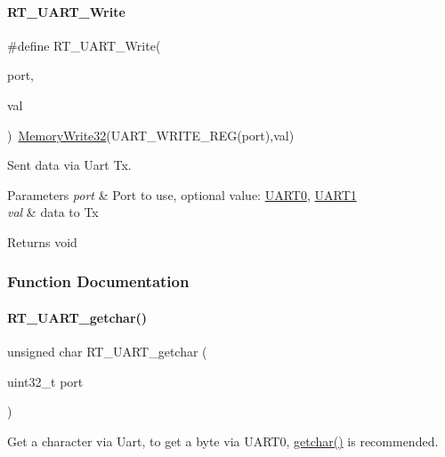 \paragraph{\texorpdfstring{R\+T\+\_\+\+U\+A\+R\+T\+\_\+\+Write}{RT\_UART\_Write}}
{\footnotesize\ttfamily \#define R\+T\+\_\+\+U\+A\+R\+T\+\_\+\+Write(\begin{DoxyParamCaption}\item[{}]{port,  }\item[{}]{val }\end{DoxyParamCaption})~\mbox{\hyperlink{a00020_a6b9732365b12e48ddb89fe1028b975b0}{Memory\+Write32}}(U\+A\+R\+T\+\_\+\+W\+R\+I\+T\+E\+\_\+\+R\+EG(port),val)}



Sent data via Uart Tx. 


\begin{DoxyParams}{Parameters}
{\em port} & Port to use, optional value\+: \mbox{\hyperlink{a00056_a0508661f121639ffdee7de2353a0def2}{U\+A\+R\+T0}}, \mbox{\hyperlink{a00056_a8d69bf04d07af4fbbab5a8bd291f65ff}{U\+A\+R\+T1}} \\
\hline
{\em val} & data to Tx \\
\hline
\end{DoxyParams}
\begin{DoxyReturn}{Returns}
void 
\end{DoxyReturn}


\subsubsection{Function Documentation}
\mbox{\label{a00056_abc136df9d66fe27bf8ffcc319246591e}} 
\paragraph{\texorpdfstring{R\+T\+\_\+\+U\+A\+R\+T\+\_\+getchar()}{RT\_UART\_getchar()}}
{\footnotesize\ttfamily unsigned char R\+T\+\_\+\+U\+A\+R\+T\+\_\+getchar (\begin{DoxyParamCaption}\item[{uint32\+\_\+t}]{port }\end{DoxyParamCaption})}



Get a character via Uart, to get a byte via U\+A\+R\+T0, \mbox{\hyperlink{a00026_a0979671914792955a7a68461634ff82d}{getchar()}} is recommended. 


